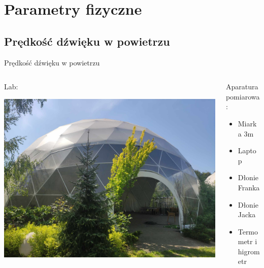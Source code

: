 \documentclass{beamer}
\begin{document}
\section{Parametry fizyczne}

\subsection{Prędkość dźwięku w powietrzu}

\begin{frame}{Prędkość dźwięku w powietrzu}

\begin{columns}
\begin{column}{0.5\textwidth}
Lab:

\includegraphics[width=\linewidth]{lab_KlaKop.jpg}
\end{column}
\begin{column}{0.5\textwidth}
Aparatura pomiarowa:
	\begin{itemize}
		\item Miarka 3m
		\item Laptop
		\item Dłonie Franka
		\item Dłonie Jacka
		\item Termometr i higrometr
	\end{itemize}
\end{column}
\end{columns}

\end{frame}
\end{document}
